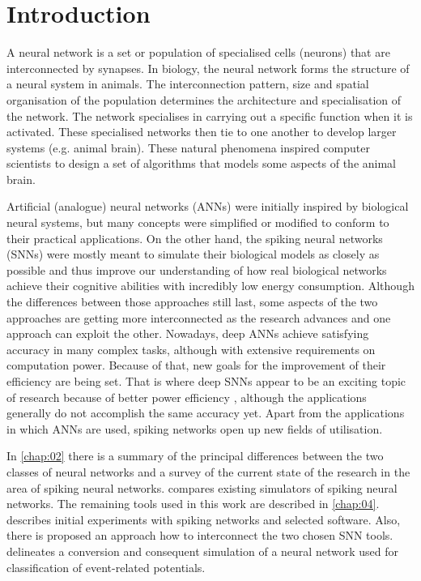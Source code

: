 \chapter{Introduction} \label{chap:01}

A neural network is a set or population of specialised cells (neurons) that are interconnected by synapses. In biology, the neural network forms the structure of a neural system in animals. The interconnection pattern, size and spatial organisation of the population determines the architecture and specialisation of the network. The network specialises in carrying out a specific function when it is activated. These specialised networks then tie to one another to develop larger systems (e.g. animal brain). These natural phenomena inspired computer scientists to design a set of algorithms that models some aspects of the animal brain.

Artificial (analogue) neural networks (ANNs) were initially inspired by biological neural systems, but many concepts were simplified or modified to conform to their practical applications. On the other hand, the spiking neural networks (SNNs) were mostly meant to simulate their biological models as closely as possible and thus improve our understanding of how real biological networks achieve their cognitive abilities with incredibly low energy consumption. Although the differences between those approaches still last, some aspects of the two approaches are getting more interconnected as the research advances and one approach can exploit the other. Nowadays, deep ANNs achieve satisfying accuracy in many complex tasks, although with extensive requirements on computation power. Because of that, new goals for the improvement of their efficiency are being set. That is where deep SNNs appear to be an exciting topic of research because of better power efficiency \cite{caoSpikingDeepConvolutional2015, tavanaeiDeepLearningSpiking2019}, although the applications generally do not accomplish the same accuracy yet. Apart from the applications in which ANNs are used, spiking networks open up new fields of utilisation. \par
In \cref{chap:02} there is a summary of the principal differences between the two classes of neural networks and a survey of the current state of the research in the area of spiking neural networks.  compares existing simulators of spiking neural networks. The remaining tools used in this work are described in \cref{chap:04}.  describes initial experiments with spiking networks and selected software. Also, there is proposed an approach how to interconnect the two chosen SNN tools.  delineates a conversion and consequent simulation of a neural network used for classification of event-related potentials.





